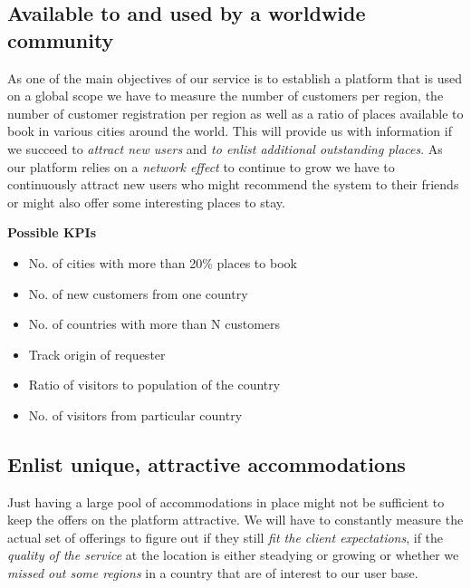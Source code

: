 
\subsection{Available to and used by a worldwide community}
As one of the main objectives of our service is to establish a platform that is used on a global scope we have to measure the number of customers per region, the number of customer registration per region as well as a ratio of places available to book in various cities around the world. This will provide us with information if we succeed to \textit{attract new users} and \textit{to enlist additional outstanding places}. As our platform relies on a \textit{network effect} to continue to grow we have to continuously attract new users who might recommend the system to their friends or might also offer some interesting places to stay.

\begin{description}
	\item \textbf{Possible KPIs}
	\begin{itemize}
    	\item No. of cities with more than 20\% places to book
        \item No. of new customers from one country
        \item No. of countries with more than N customers
        \item Track origin of requester
        \item Ratio of visitors to population of the country
        \item No. of visitors from particular country
    \end{itemize}
\end{description}


\subsection{Enlist unique, attractive accommodations}
Just having a large pool of accommodations in place might not be sufficient to keep the offers on the platform attractive. We will have to constantly measure the actual set of offerings to figure out if they still \textit{fit the client expectations}, if the \textit{quality of the service} at the location is either steadying or growing or whether we \textit{missed out some regions} in a country that are of interest to our user base.

